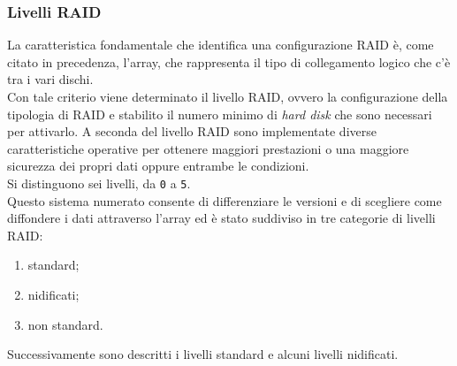 \item
\subsubsection{Livelli RAID}
La caratteristica fondamentale che identifica una configurazione RAID \`{e}, come citato in precedenza, l'array, che rappresenta il tipo di collegamento logico che c'\`{e} tra i vari dischi.\\
Con tale criterio viene determinato il livello RAID, ovvero la configurazione della tipologia di RAID  e stabilito il numero minimo di \textit{hard disk} che sono necessari per attivarlo. A seconda del livello RAID sono implementate diverse caratteristiche operative per ottenere maggiori prestazioni o una maggiore sicurezza dei propri dati oppure entrambe le condizioni.\\

Si distinguono sei livelli, da \verb"0" a \verb"5".\\
Questo sistema numerato consente di differenziare le versioni e di scegliere come diffondere i dati attraverso l'array ed \`{e} stato suddiviso in tre categorie di livelli RAID: 
\begin{enumerate}
\item 
standard;
\item
nidificati;
\item
non standard.\cite{etichetta9}
\end{enumerate}

Successivamente sono descritti i livelli standard e alcuni livelli nidificati.

